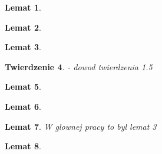 \documentclass[licencjacka]{pwr_wmat_praca_dyplomowa}
\theoremstyle{plain}
\newtheorem{theorem}{Twierdzenie}
\numberwithin{theorem}{chapter}
\newtheorem{lemma}[theorem]{Lemat}
\theoremstyle{definition}
\numberwithin{theorem}{chapter}
\begin{document}
\begin{lemma} \label{F_jest_niepustym_domknietym_podzbiorem_trojkatnych}
\end{lemma}

\begin{lemma} \label{trojkatne_tworza_przestrzen_metryczna_zupelna}
\end{lemma}

\begin{lemma} \label{przekroj_rezydualnych_jest_rezydualny}
\end{lemma}

\begin{theorem} \label{tranzytywne_rezydualne_w_F}
\cite{alseda1999entropy} - dowod twierdzenia 1.5
\end{theorem}

\begin{lemma} \label{Fso_sa_otwartymi_podzbiorami_F}
\end{lemma}

\begin{lemma}
\label{w_otoczeniu_niezmienniczego_jest_otwarty_zawarty_w_iteracjach}
\end{lemma}

\begin{lemma}
\label{lemat_3_glownego_artykulu_istnieje_orbita_okresowa_krojaca_sie_z_rodzina_otwartych}
W glownej pracy to byl lemat 3
\end{lemma}

\begin{lemma}
\label{wszystkie_wloknowe_na_implikuje_punkt_okresowy}
\end{lemma}
\end{document}

